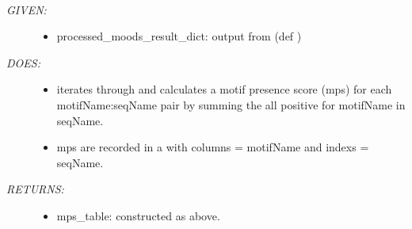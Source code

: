 \documentclass[letterpaper,10pt,english]{sphinxmanual}
\begin{document}

\begin{fulllineitems}
\label{code:gfunc.motifs.motif_profiles_weighted_by_score}~\begin{description}
\item[{\emph{GIVEN:}}] \leavevmode\begin{itemize}
\item {} 
processed\_moods\_result\_dict: output from (def )

\end{itemize}

\item[{\emph{DOES:}}] \leavevmode\begin{itemize}
\item {} 
iterates through  and calculates a motif presence score (mps)
for each motifName:seqName pair by summing the all positive  for motifName in seqName.

\item {} 
mps are recorded in a  with columns = motifName and indexs = seqName.

\end{itemize}

\item[{\emph{RETURNS:}}] \leavevmode\begin{itemize}
\item {} 
mps\_table:  constructed as above.

\end{itemize}

\end{description}

\end{fulllineitems}

\end{document}
